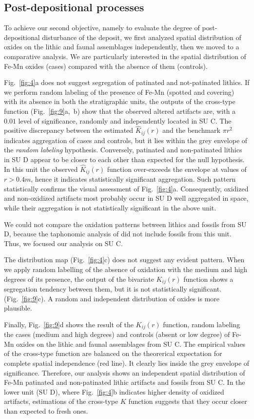 \documentclass[review,authoryear]{elsarticle} %
\begin{document}
\subsection{Post-depositional processes}

To achieve our second objective, namely to evaluate the degree of post-depositional disturbance of the deposit, we first analyzed spatial distribution of oxides on the lithic and faunal assemblages independently, then we moved to a comparative analysis. We are particularly interested in the spatial distribution of Fe-Mn oxides (cases) compared with the absence of them (controls).

Fig.~\ref{fig:4}a does not suggest segregation of patinated and not-patinated lithics. If we perform random labeling of the presence of Fe-Mn (spotted and covering) with its absence in both the stratigraphic units, the outputs of the cross-type function (Fig.~\ref{fig:9}a,~b) show that the observed altered artifacts are, with a $0.01$ level of significance, randomly and independently located in SU C. The positive discrepancy between the estimated $\hat K_{ij}(r)$ and the benchmark $\pi r^2$ indicates aggregation of cases and controls, but it lies within the grey envelope of the \emph{random labeling} hypothesis. Conversely, patinated and non-patinated lithics in SU D appear to be closer to each other than expected for the null hypothesis. In this unit the observed $\hat K_{ij}(r)$ function over-exceeds the envelope at values of $r>0.4 m$, hence it indicates statistically significant aggregation. Such pattern statistically confirms the visual assessment of Fig.~\ref{fig:4}a. Consequently, oxidized and non-oxidized artifacts most probably occur in SU D well aggregated in space, while their aggregation is not statistically significant in the above unit.

We could not compare the oxidation patterns between lithics and fossils from SU D, because the taphonomic analysis of \citet{Bagnus2011} did not include fossils from this unit. Thus, we focused our analysis on SU C.

The distribution map (Fig.~\ref{fig:4}c) does not suggest any evident pattern. When we apply random labelling of the absence of oxidation with the medium and high degrees of its presence, the output of the bivariate $K_{ij}(r)$ function shows a segregation tendency between them, but it is not statistically significant. (Fig.~\ref{fig:9}c). A random and independent distribution of oxides is more plausible.

Finally, Fig.~\ref{fig:9}d shows the result of the $K_{ij}(r)$ function, random labeling the cases (medium and high degrees) and controls (absent or low degree) of Fe-Mn oxides on the lithic and faunal assemblages from SU C. The empirical values of the cross-type function are balanced on the theorerical expectation for complete spatial independence (red line). It clearly lies inside the grey envelope of significance. Therefore, our analysis shows an independent spatial distribution of Fe-Mn patinated and non-patinated lithic artifacts and fossils from SU C. In the lower unit (SU D), where Fig.~\ref{fig:4}b indicates higher density of oxidized artifacts, estimations of the cross-type $K$ function suggests that they occur closer than expected to fresh ones.
\end{document}
